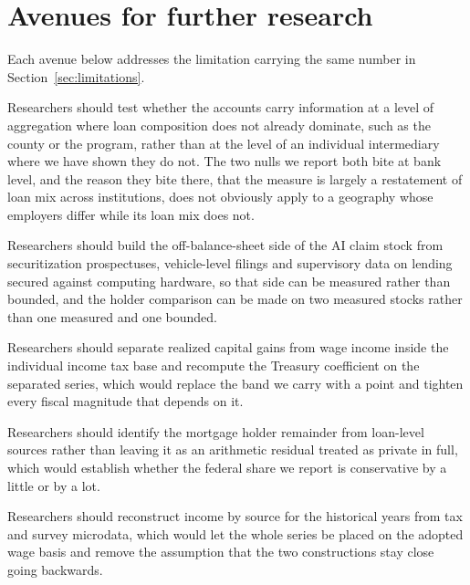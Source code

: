 \section{Avenues for further research}
\label{sec:future}

Each avenue below addresses the limitation carrying the same number in
Section~\ref{sec:limitations}.

\begin{description}[leftmargin=2.4em,style=nextline]

  \item[FR1] Researchers should test whether the accounts carry information at a level of
  aggregation where loan composition does not already dominate, such as the county or the
  program, rather than at the level of an individual intermediary where we have shown they do
  not. The two nulls we report both bite at bank level, and the reason they bite there, that the
  measure is largely a restatement of loan mix across institutions, does not obviously apply to a
  geography whose employers differ while its loan mix does not.

  \item[FR2] Researchers should build the off-balance-sheet side of the AI claim stock from
  securitization prospectuses, vehicle-level filings and supervisory data on lending secured
  against computing hardware, so that side can be measured rather than bounded, and the holder
  comparison can be made on two measured stocks rather than one measured and one bounded.

  \item[FR3] Researchers should separate realized capital gains from wage income inside the
  individual income tax base and recompute the Treasury coefficient on the separated series,
  which would replace the band we carry with a point and tighten every fiscal magnitude that
  depends on it.

  \item[FR4] Researchers should identify the mortgage holder remainder from loan-level sources
  rather than leaving it as an arithmetic residual treated as private in full, which would
  establish whether the federal share we report is conservative by a little or by a lot.

  \item[FR5] Researchers should reconstruct income by source for the historical years from tax
  and survey microdata, which would let the whole series be placed on the adopted wage basis and
  remove the assumption that the two constructions stay close going backwards.


\end{description}
